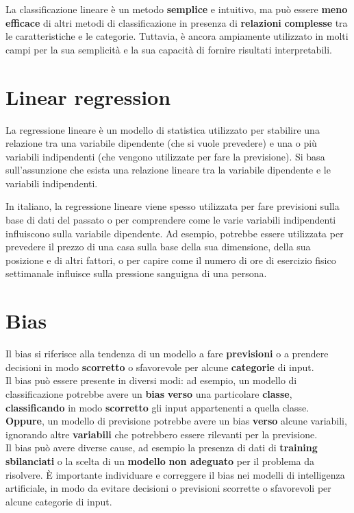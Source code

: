 \documentclass{article}
\begin{document}
La classificazione lineare è un metodo \textbf{semplice} e intuitivo, ma può essere \textbf{meno} \textbf{efficace} di altri metodi di classificazione in presenza di \textbf{relazioni} \textbf{complesse} tra le caratteristiche e le categorie. Tuttavia, è ancora ampiamente utilizzato in molti campi per la sua semplicità e la sua capacità di fornire risultati interpretabili.

\section{Linear regression}
La regressione lineare è un modello di statistica utilizzato per stabilire una relazione tra una variabile dipendente (che si vuole prevedere) e una o più variabili indipendenti (che vengono utilizzate per fare la previsione). Si basa sull'assunzione che esista una relazione lineare tra la variabile dipendente e le variabili indipendenti.

In italiano, la regressione lineare viene spesso utilizzata per fare previsioni sulla base di dati del passato o per comprendere come le varie variabili indipendenti influiscono sulla variabile dipendente. Ad esempio, potrebbe essere utilizzata per prevedere il prezzo di una casa sulla base della sua dimensione, della sua posizione e di altri fattori, o per capire come il numero di ore di esercizio fisico settimanale influisce sulla pressione sanguigna di una persona.


\section{Bias}
Il bias si riferisce alla tendenza di un modello a fare \textbf{previsioni} o a prendere decisioni in modo \textbf{scorretto} o sfavorevole per alcune \textbf{categorie} di input.
\\
Il bias può essere presente in diversi modi: ad esempio, un modello di classificazione potrebbe avere un \textbf{bias} \textbf{verso} una particolare \textbf{classe}, \textbf{classificando} in modo \textbf{scorretto} gli input appartenenti a quella classe. \textbf{Oppure}, un modello di previsione potrebbe avere un bias \textbf{verso} alcune variabili, ignorando altre \textbf{variabili} che potrebbero essere rilevanti per la previsione.
\\
Il bias può avere diverse cause, ad esempio la presenza di dati di \textbf{training} \textbf{sbilanciati} o la scelta di un \textbf{modello} \textbf{non adeguato} per il problema da risolvere. È importante individuare e correggere il bias nei modelli di intelligenza artificiale, in modo da evitare decisioni o previsioni scorrette o sfavorevoli per alcune categorie di input.
\end{document}

